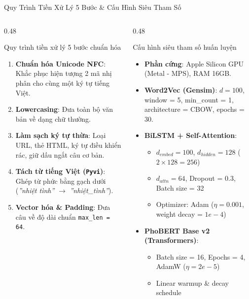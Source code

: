 \documentclass[aspectratio=169, 10pt]{beamer}
\begin{document}
\begin{frame}{Quy Trình Tiền Xử Lý 5 Bước \& Cấu Hình Siêu Tham Số}
  \begin{columns}[T, onlytextwidth]
    \begin{column}{0.48\textwidth}
      \begin{block}{Quy trình tiền xử lý 5 bước chuẩn hóa}
        \fontsize{8}{10.5}\selectfont
        \begin{enumerate}\setlength{\itemsep}{0.2em}
          \item \textbf{Chuẩn hóa Unicode NFC}: Khắc phục hiện tượng 2 mã nhị phân cho cùng một ký tự tiếng Việt.
          \item \textbf{Lowercasing}: Đưa toàn bộ văn bản về dạng chữ thường.
          \item \textbf{Làm sạch ký tự thừa}: Loại URL, thẻ HTML, ký tự điều khiển rác, giữ dấu ngắt câu cơ bản.
          \item \textbf{Tách từ tiếng Việt (\texttt{Pyvi})}: Ghép từ phức bằng gạch dưới (\textit{''nhiệt tình''} $\to$ \textit{''nhiệt\_tình''}).
          \item \textbf{Vector hóa \& Padding}: Đưa câu về độ dài chuẩn \texttt{max\_len = 64}.
        \end{enumerate}
      \end{block}
    \end{column}
    \hfill
    \begin{column}{0.48\textwidth}
      \begin{block}{Cấu hình siêu tham số huấn luyện}
        \fontsize{8}{10.5}\selectfont
        \begin{itemize}\setlength{\itemsep}{0.2em}
          \item \textbf{Phần cứng}: Apple Silicon GPU (Metal - MPS), RAM 16GB.
          \item \textbf{Word2Vec (Gensim)}: $d = 100$, window = 5, min\_count = 1, architecture = CBOW, epochs = 30.
          \item \textbf{BiLSTM + Self-Attention}:
            \begin{itemize}\fontsize{7.5}{9}\selectfont
              \item $d_{embed} = 100$, $d_{hidden} = 128$ ($2 \times 128 = 256$)
              \item $d_{attn} = 64$, Dropout = 0.3, Batch size = 32
              \item Optimizer: Adam ($\eta = 0.001$, weight decay = $1e-4$)
            \end{itemize}
          \item \textbf{PhoBERT Base v2 (Transformers)}:
            \begin{itemize}\fontsize{7.5}{9}\selectfont
              \item Batch size = 16, Epochs = 4, AdamW ($\eta = 2e-5$)
              \item Linear warmup \& decay schedule
            \end{itemize}
        \end{itemize}
      \end{block}
    \end{column}
  \end{columns}
\end{frame}
\end{document}

